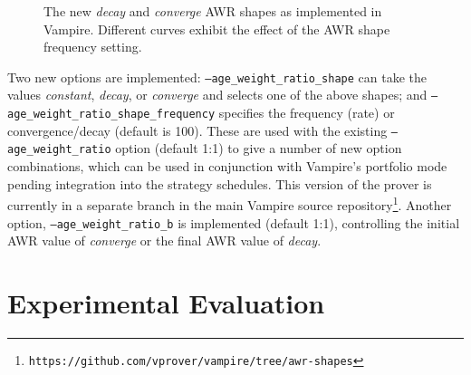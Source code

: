 \documentclass{llncs}
\begin{document}
\begin{figure}[t]
	\caption{The new \emph{decay} and \emph{converge} AWR shapes as implemented in Vampire. Different curves exhibit the effect of the AWR shape frequency setting.}
	\label{fig:decay-and-converge}
\end{figure}

Two new options are implemented: \texttt{--age\_weight\_ratio\_shape} can take the values \emph{constant}, \emph{decay}, or \emph{converge} and selects one of the above shapes; and \texttt{--age\_weight\_ratio\_shape\_frequency} specifies the frequency (rate) or convergence/decay (default is 100). These are used with the existing \texttt{--age\_weight\_ratio} option (default 1:1) to give a number of new option combinations, which can be used in conjunction with Vampire's portfolio mode pending integration into the strategy schedules.
This version of the prover is currently in a separate branch in the main Vampire source repository\footnote{\texttt{https://github.com/vprover/vampire/tree/awr-shapes}}.
Another option, \texttt{--age\_weight\_ratio\_b} is implemented (default 1:1), controlling the initial AWR value of \emph{converge} or the final AWR value of \emph{decay}.

\section{Experimental Evaluation}
\label{sec:experiments}
\end{document}
